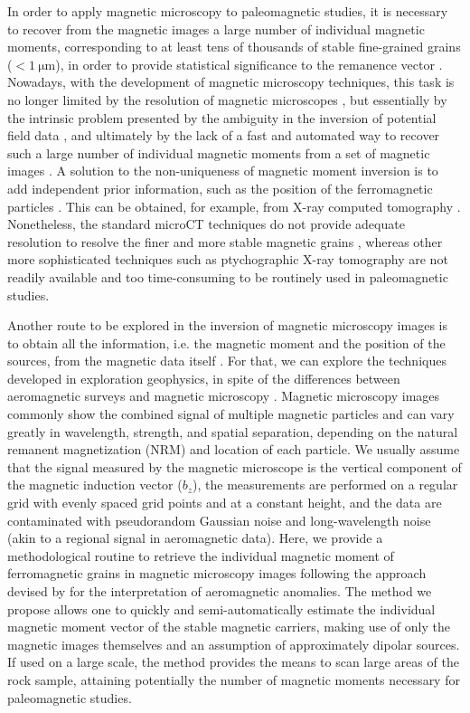 In order to apply magnetic microscopy to paleomagnetic studies, it is necessary
to recover from the magnetic images a large number of individual magnetic
moments, corresponding to at least tens of thousands of stable fine-grained
grains ($< \qty{1}{\um}$), in order to provide statistical significance to the
remanence vector \citep[e.g., ][]{Berndt2016}. Nowadays, with the development of
magnetic microscopy techniques, this task is no longer limited by the
resolution of magnetic microscopes \citep{Fu2020, Weiss2007, DeGroot2018,
Glenn2017, Lima2014}, but essentially by the intrinsic problem presented by the
ambiguity in the inversion of potential field data \citep{Barbosa2011,
DeGroot2021, Oliveira2015Estimation}, and ultimately by the lack of a fast and
automated way to recover such a large number of individual magnetic moments
from a set of magnetic images \citep{CortesOrtuno2022, Lima2013, Lima2009}. A
solution to the non-uniqueness of magnetic moment inversion is to add
independent prior information, such as the position of the ferromagnetic
particles \citep{Fabian2019}. This can be obtained, for example, from X-ray
computed tomography \citep[microCT; ][]{Fabian2019, DeGroot2021, DeGroot2018}.
Nonetheless, the standard microCT techniques do not provide adequate resolution
to resolve the finer and more stable magnetic grains \citep{CortesOrtuno2022,
DeGroot2021}, whereas other more sophisticated techniques such as ptychographic
X-ray tomography \citep[e.g., ][]{Maldanis2020} are not readily available and
too time-consuming to be routinely used in paleomagnetic studies.

Another route to be explored in the inversion of magnetic microscopy images is
to obtain all the information, i.e. the magnetic moment and the position of the
sources, from the magnetic data itself \citep[e.g., ][]{Fu2020}. For that, we can
explore the techniques developed in exploration geophysics, in spite of the
differences between aeromagnetic surveys and magnetic microscopy
\citep{Lima2013}. Magnetic microscopy images commonly show the combined signal
of multiple magnetic particles and can vary greatly in wavelength, strength,
and spatial separation, depending on the natural remanent magnetization (NRM) and location of each particle. We
usually assume that the signal measured by the magnetic microscope is the
vertical component of the magnetic induction vector ($b_z$), the measurements
are performed on a regular grid with evenly spaced grid points and at a
constant height, and the data are contaminated with pseudorandom Gaussian noise and
long-wavelength noise (akin to a regional signal in aeromagnetic data). Here,
we provide a methodological routine to retrieve the individual magnetic moment
of ferromagnetic grains in magnetic microscopy images following the approach
devised by \citet{Oliveira2015Estimation} for the interpretation of
aeromagnetic anomalies. The method we propose allows one to quickly and
semi-automatically estimate the individual magnetic moment vector of the stable
magnetic carriers, making use of only the magnetic images themselves and an
assumption of approximately dipolar sources. If used on a large scale, the
method provides the means to scan large areas of the rock sample, attaining
potentially the number of magnetic moments necessary for paleomagnetic studies.


